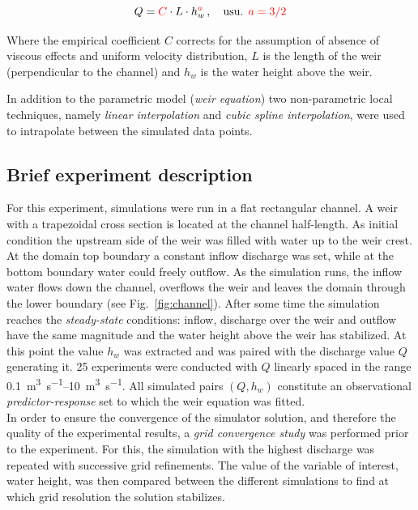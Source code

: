 \begin{equation}\label{eq:weir_eq}
  Q = \textcolor{red}{C} \cdot L \cdot h_w^{\textcolor{red}{a}}\, , \quad \mbox{usu. } \textcolor{red}{a = 3/2}
\end{equation}

\noindent Where the empirical coefficient $C$ corrects for the assumption of absence of viscous effects and uniform velocity distribution, $L$ is the length of the weir (perpendicular to the channel) and $h_w$ is the water height above the weir.

In addition to the parametric model (\textit{weir equation}) two non-parametric local techniques, namely \emph{linear interpolation} and \emph{cubic spline interpolation}, were used to intrapolate between the simulated data points.\\


\subsection{Brief experiment description}\label{sec:cs1_brief_description}

For this experiment, simulations were run in a flat rectangular channel.
A weir with a trapezoidal cross section is located at the channel half-length.
As initial condition the upstream side of the weir was filled with water up to the weir crest.
At the domain top boundary a constant inflow discharge was set, while at the bottom boundary water could freely outflow.
As the simulation runs, the inflow water flows down the channel, overflows the weir and leaves the domain through the lower boundary (see Fig.~\ref{fig:channel}).
After some time the simulation reaches the \emph{steady-state} conditions: inflow, discharge over the weir and outflow have the same magnitude and the water height above the weir has stabilized.
At this point the value $h_w$ was extracted and was paired with the discharge value $Q$ generating it.
\num{25} experiments were conducted with $Q$ linearly spaced in the range \SIrange{0.1}{10}{\cubic\meter\per\second}.
All simulated pairs $(Q, h_w)$ constitute an observational \emph{predictor-response} set to which the weir equation was fitted.\\

In order to ensure the convergence of the simulator solution, and therefore the quality of the experimental results, a \emph{grid convergence study} was performed prior to the experiment.
For this, the simulation with the highest discharge was repeated with successive grid refinements.
The value of the variable of interest, water height, was then compared between the different simulations to find at which grid resolution the solution stabilizes.


